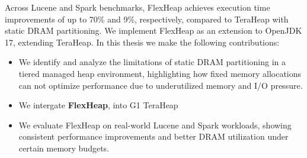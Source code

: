 Across Lucene and Spark benchmarks, FlexHeap achieves 
execution time improvements of up to 70\% and 9\%, respectively, compared to 
TeraHeap with static DRAM partitioning. We implement FlexHeap as an extension 
to OpenJDK 17, extending TeraHeap.
In this thesis we make the following contributions:

\vspace{0.5em}
\begin{itemize}
\item We identify and analyze the limitations of static DRAM partitioning in a tiered managed heap 
  environment, highlighting how fixed memory allocations can not optimize performance 
  due to underutilized memory and I/O pressure.

\item We intergate \textbf{FlexHeap}, into G1 TeraHeap \cite{melidonis_thesis, mairh_thesis}

\item We evaluate FlexHeap on real-world Lucene and Spark workloads, showing consistent
  performance improvements and better DRAM utilization under certain memory budgets.

\end{itemize}
